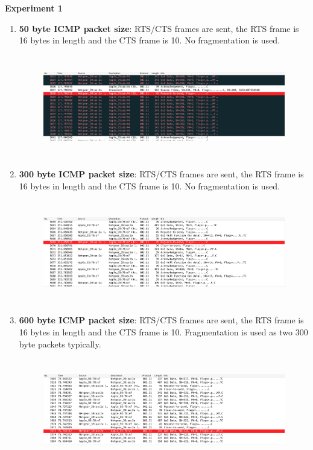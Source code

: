 \documentclass[11pt]{article}
\begin{document}
\begin{enumerate}[label=(\alph*)]
{	\textbf{Experiment 1}
	\begin{enumerate}
		\item {\textbf{50 byte ICMP packet size}: RTS/CTS frames are sent, the RTS frame is 16 bytes in length and the CTS frame is 10. No fragmentation is used.
			\begin{figure}[h]
				\begin{center}
					\includegraphics[keepaspectratio,height=4.5cm]{wireshark_5_1_1.png}
				\end{center}
			\end{figure}
		}
		\item {\textbf{300 byte ICMP packet size}: RTS/CTS frames are sent, the RTS frame is 16 bytes in length and the CTS frame is 10. No fragmentation is used.
			\begin{figure}[h]
				\begin{center}
					\includegraphics[keepaspectratio,height=4.5cm]{wireshark_5_1_2.png}
				\end{center}
			\end{figure}
		}
		\item {\textbf{600 byte ICMP packet size}: RTS/CTS frames are sent, the RTS frame is 16 bytes in length and the CTS frame is 10. Fragmentation is used as two 300 byte packets typically.
			\begin{figure}[h]
				\begin{center}
					\includegraphics[keepaspectratio,height=4.5cm]{wireshark_5_1_3.png}
				\end{center}
			\end{figure}
		}
		

\end{enumerate}}
\end{enumerate}
\end{document}
